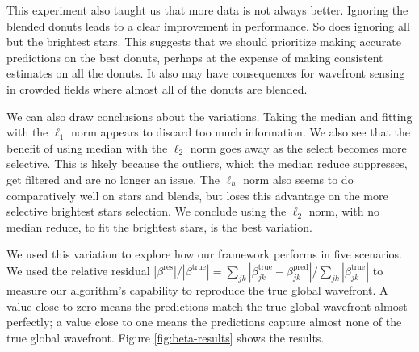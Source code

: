 This experiment also taught us that more data is not always better. Ignoring the blended donuts leads to a clear improvement in performance. So does ignoring all but the brightest stars. This suggests that we should prioritize making accurate predictions on the best donuts, perhaps at the expense of making consistent estimates on all the donuts. It also may have consequences for wavefront sensing in crowded fields where almost all of the donuts are blended.

We can also draw conclusions about the variations. Taking the median and fitting with the $\ell_1$ norm appears to discard too much information. We also see that the benefit of using median with the $\ell_2$ norm goes away as the select becomes more selective. This is likely because the outliers, which the median reduce suppresses, get filtered and are no longer an issue. The $\ell_{h}$ norm also seems to do comparatively well on stars and blends, but loses this advantage on the more selective brightest stars selection. We conclude using the $\ell_2$ norm, with no median reduce, to fit the brightest stars, is the best variation.

We used this variation to explore how our framework performs in five scenarios. We used the relative residual $|\beta^{\text{res}}| / |\beta^{\text{true}}| = \sum_{jk}|\beta^{\text{true}}_{jk} - \beta^{\text{pred}}_{jk}| / \sum_{jk}|\beta^{\text{true}}_{jk}|$ to measure our algorithm's capability to reproduce the true global wavefront. A value close to zero means the predictions match the true global wavefront almost perfectly; a value close to one means the predictions capture almost none of the true global wavefront. Figure \ref{fig:beta-results} shows the results.

